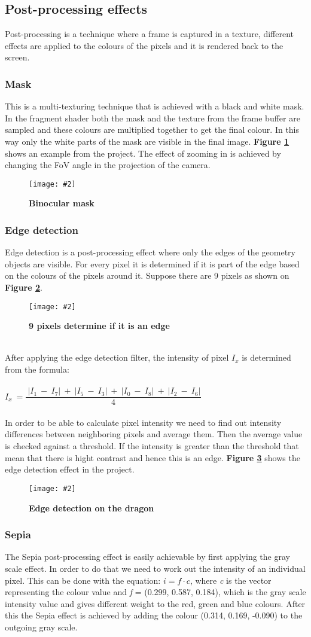 \documentclass[10pt, a4paper]{article}
\newcommand{\figuremacro}[5]{
    \begin{figure}[#1]
        \centering
        \texttt{[image: \#2]}
        \caption[#3]{\textbf{#3}#4}
        \label{fig:#2}
    \end{figure}
}
\begin{document}
	\subsection{Post-processing effects}
	Post-processing is a technique where a frame is captured in a texture, different effects are applied to the colours of the pixels and it is rendered back to the screen.
	\subsubsection{Mask}
	This is a multi-texturing technique that is achieved with a black and white mask. In the fragment shader both the mask and the texture from the frame buffer are sampled and these colours are multiplied together to get the final colour. In this way only the white parts of the mask are visible in the final image. \textbf{Figure {\ref{fig:maskEffect}}} shows an example from the project. The effect of zooming in is achieved by changing the FoV angle in the projection of the camera.
	\figuremacro{h}{maskEffect}{Binocular mask}{ }{0.9}
	\subsubsection{Edge detection}
	Edge detection is a post-processing effect where only the edges of the geometry objects are visible. For every pixel it is determined if it is part of the edge based on the colours of the pixels around it. Suppose there are 9 pixels as 
	shown on \textbf{Figure {\ref{fig:edgeDetectionMatrix}}}. 
	\figuremacro{h}{edgeDetectionMatrix}{9 pixels determine if it is an edge}{ }{0.5}
	\\After applying the edge detection filter, the intensity of pixel $I_{x}$ is determined from the formula: \\\\
	$I_{x}~=\dfrac{~|I_{1}~-~I_{7}|~+~|I_{5}~-~I_{3}|~+~|I_{0}~-~I_{8}|~+~|I_{2}~-~I_{6}|}{4}$~
	\\\\ In order to be able to calculate pixel intensity we need to find out intensity differences between neighboring pixels and average them. Then the average value is checked against a threshold. If the intensity is greater than the threshold that mean that there is hight contrast and hence this is an edge. \textbf{Figure {\ref{fig:edgeDetection}}} shows the edge detection effect in the project.
	\figuremacro{h}{edgeDetection}{Edge detection on the dragon}{ }{0.5}
	\subsubsection{Sepia}
	The Sepia post-processing effect is easily achievable by first applying the gray scale effect. In order to do that we need to work out the intensity of an individual pixel. This can be done with the equation: $i = f \cdot c$, where \textit{c} is the vector representing the colour value and \textit{f} = (0.299, 0.587, 0.184), which is the gray scale intensity value and gives different weight to the red, green and blue colours. After this the Sepia effect is achieved by adding the colour (0.314, 0.169, -0.090) to the outgoing gray scale.
\end{document}
